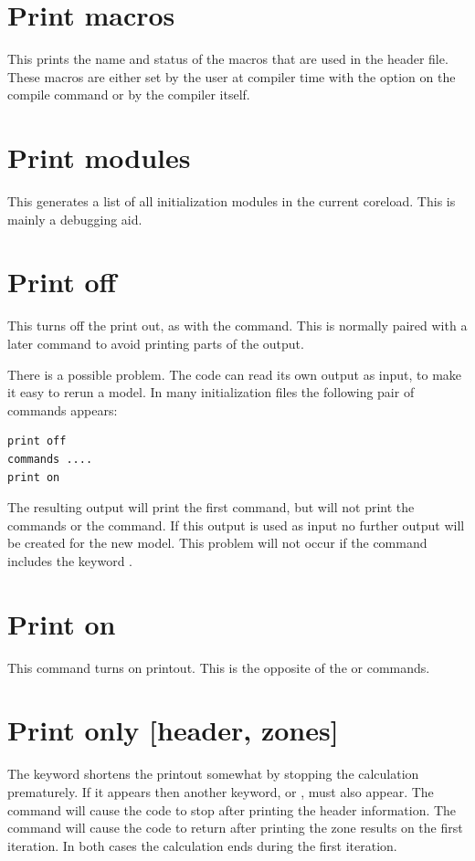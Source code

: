 \section{Print macros}
This prints the name and status of the macros that are used in the
 header file.
These macros are either set by the user at compiler time with the
 option on the compile command or by the compiler itself.

\section{Print modules}
This generates a list of all initialization modules in the current coreload.  
This is mainly a debugging aid.

\section{Print off}

This turns off the print out, as with the  command.  This is normally paired with a later  command
to avoid printing parts of the output.

There is a possible problem.
The code can read its own output as input,
to make it easy to rerun a model.
In many initialization files the following
pair of commands appears:
\begin{verbatim}
print off
commands ....
print on
\end{verbatim}

The resulting output will print the first  command, but will
not print the commands or the  command.
If this output is used
as input no further output will be created for the new model.
This problem
will not occur if the  command includes the keyword
.

\section{Print on}

This command turns on printout.
This is the opposite of the 
or  commands.

\section{Print only [header, zones]}

The keyword  shortens the printout somewhat by stopping the
calculation prematurely.
If it appears then another keyword,
 or
, must also appear.
The command  will cause the code
to stop after printing the header information.
The command 
will cause the code to return after printing the zone results on the first
iteration.
In both cases the calculation ends during the first iteration.

